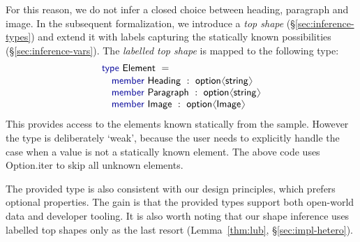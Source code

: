 \documentclass[10pt,preprint,blind,clearpagebib]{sigplanconf}
\newcommand{\langl}{\begin{picture}(4.5,7)
\put(1.1,2.5){\rotatebox{60}{\line(1,0){5.5}}}
\put(1.1,2.5){\rotatebox{300}{\line(1,0){5.5}}}
\end{picture}}
\newcommand{\rangl}{\begin{picture}(4.5,7)
\put(.9,2.5){\rotatebox{120}{\line(1,0){5.5}}}
\put(.9,2.5){\rotatebox{240}{\line(1,0){5.5}}}
\end{picture}}
\newcommand{\kvd}[1]{\textnormal{\textcolor{kvdclr}{\sffamily #1}}}
\newcommand{\ident}[1]{\textnormal{\sffamily #1}}
\begin{document}
For this reason, we do not infer a closed choice between heading, paragraph and image. In the 
subsequent formalization, we introduce a \emph{top shape} (\S\ref{sec:inference-types}) and extend 
it with labels capturing the statically known possibilities (\S\ref{sec:inference-vars}). The 
\emph{labelled top shape} is mapped to the following type:
%
\begin{equation*}
\begin{array}{l}
 \kvd{type}~\ident{Element}~=  \\[0.1em]
 \quad \kvd{member}~\ident{Heading}~:~\ident{option}\langl \ident{string} \rangl\\
 \quad \kvd{member}~\ident{Paragraph}~:~\ident{option}\langl \ident{string} \rangl\\
 \quad \kvd{member}~\ident{Image}~:~\ident{option}\langl \ident{Image} \rangl\\
\end{array}
\end{equation*}
%
This provides access to the elements known statically from the sample. However the type is 
deliberately `weak', because the user needs to explicitly handle the case when a value is not 
a statically known element. The above code uses \ident{Option.iter} to skip all unknown elements. 

The provided type is also consistent with our design principles, which prefers optional properties. 
The gain is that the provided types support both open-world data and developer tooling. It is also 
worth noting that our shape inference uses labelled top shapes only as the last resort 
(Lemma~\ref{thm:lub}, \S\ref{sec:impl-hetero}).

\end{document}
